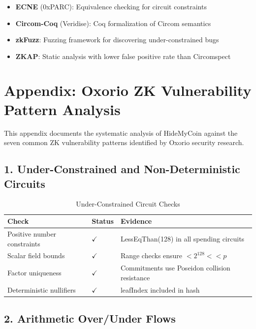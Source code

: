 \documentclass[11pt,a4paper]{article}
\begin{document}
\begin{itemize}
    \item \textbf{ECNE} (0xPARC): Equivalence checking for circuit constraints
    \item \textbf{Circom-Coq} (Veridise): Coq formalization of Circom semantics
    \item \textbf{zkFuzz}: Fuzzing framework for discovering under-constrained bugs
    \item \textbf{ZKAP}: Static analysis with lower false positive rate than Circomspect
\end{itemize}

\section{Appendix: Oxorio ZK Vulnerability Pattern Analysis}

This appendix documents the systematic analysis of HideMyCoin against the seven common ZK vulnerability patterns identified by Oxorio security research.

\subsection{1. Under-Constrained and Non-Deterministic Circuits}

\begin{table}[H]
\centering
\begin{tabular}{|l|l|l|}
\hline
\textbf{Check} & \textbf{Status} & \textbf{Evidence} \\
\hline
Positive number constraints & $\checkmark$ & LessEqThan(128) in all spending circuits \\
Scalar field bounds & $\checkmark$ & Range checks ensure $< 2^{128} << p$ \\
Factor uniqueness & $\checkmark$ & Commitments use Poseidon collision resistance \\
Deterministic nullifiers & $\checkmark$ & leafIndex included in hash \\
\hline
\end{tabular}
\caption{Under-Constrained Circuit Checks}
\end{table}

\subsection{2. Arithmetic Over/Under Flows}
\end{document}
